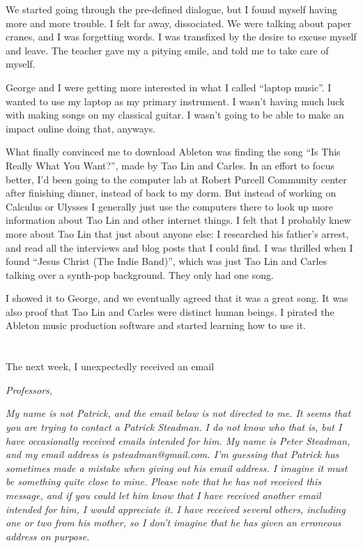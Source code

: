 We started going through the pre-defined dialogue, but I found myself having
more and more trouble.  I felt far away, dissociated.  We were talking about
paper cranes, and I was forgetting words.  I was transfixed by the desire to
excuse myself and leave.  The teacher gave my a pitying smile, and told me to
take care of myself.

George and I were getting more interested in what I called ``laptop music''.  I
wanted to use my laptop as my primary instrument.  I wasn't having much luck
with making songs on my classical guitar.  I wasn't going to be able to make an
impact online doing that, anyways.  

What finally convinced me to download Ableton was finding the song ``Is This
Really What You Want?'', made by Tao Lin and Carles.  In an effort to focus
better, I'd been going to the computer lab at Robert Purcell Community center
after finishing dinner, instead of back to my dorm.  But instead of working on
Calculus or Ulysses I generally just use the computers there to look up more
information about Tao Lin and other internet things.  I felt that I probably
knew more about Tao Lin that just about anyone else: I researched his father's
arrest, and read all the interviews and blog posts that I could find.  I was
thrilled when I found ``Jesus Christ (The Indie Band)'', which was just Tao Lin
and Carles talking over a synth-pop background.  They only had one song.  

I showed it to George, and we eventually agreed that it was a great song. It was
also proof that  Tao Lin and Carles were distinct human beings.  I pirated the
Ableton music production software and started learning how to use it.  

\section{}

The next week, I unexpectedly received an email

\textit{Professors,}

\textit{My name is not Patrick, and the email below is not directed to me.  It seems
that you are trying to contact a Patrick Steadman.  I do not know who that is,
but I have occasionally received emails intended for him.  My name is Peter
Steadman, and my email address is psteadman@gmail.com.  I'm guessing that
Patrick has sometimes made a mistake when giving out his email address.  I
imagine it must be something quite close to mine.  Please note that he has not
received this message, and if you could let him know that I have received
another email intended for him, I would appreciate it.  I have received
several others, including one or two from his mother, so I don't imagine that
he has given an erroneous address on purpose.
}

